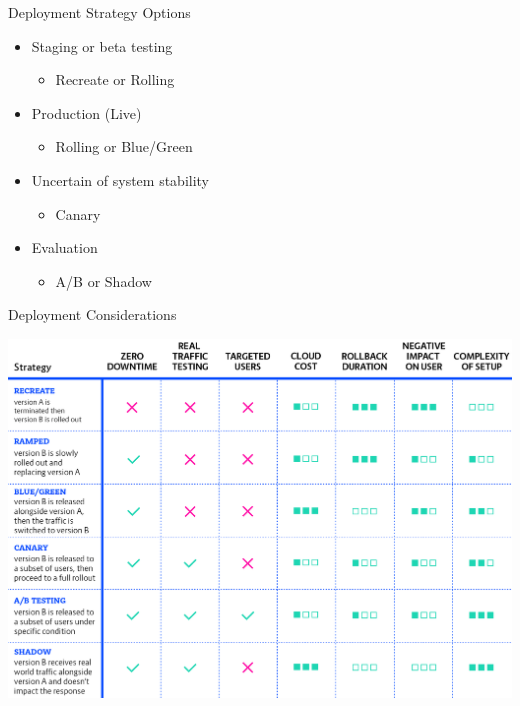 \documentclass{slide}
\begin{document}
\begin{frame}{Deployment Strategy Options}
  \vspace{1pt}
  {\huge
    \begin{itemize}
        \item Staging or beta testing
        \begin{itemize}
            \LARGE\item Recreate or Rolling
        \end{itemize}
        \vspace{1mm}
        \item Production (Live)
        \begin{itemize}
            \LARGE\item Rolling or Blue/Green
        \end{itemize}
        \vspace{1mm}
        \item Uncertain of system stability
        \begin{itemize}
            \LARGE\item Canary
        \end{itemize}
        \vspace{1mm}
        \item Evaluation
        \begin{itemize}
            \LARGE\item A/B or Shadow
        \end{itemize}
    \end{itemize}
  }
\end{frame}

\begin{frame}{Deployment Considerations \cite{deployment-strategies}}
    \begin{adjustwidth}{-12mm}{-12mm}
        \centering
        \includegraphics[height=0.96\textheight]{diagrams/deployment_strategies.png}
    \end{adjustwidth}
\end{frame}
\end{document}
